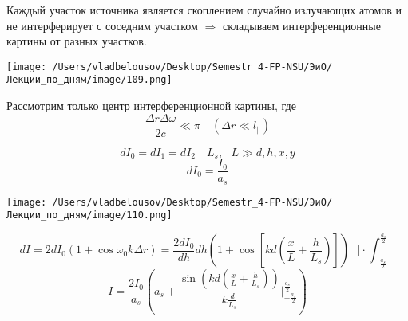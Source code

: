 \documentclass[12pt, a4paper]{report}
\begin{document}
Каждый участок источника является скоплением случайно излучающих атомов и не интерферирует с соседним участком \( \Rightarrow \)  складываем интерференционные картины от разных участков.

\begin{center}
    \texttt{[image: /Users/vladbelousov/Desktop/Semestr\_4-FP-NSU/ЭиО/Лекции\_по\_дням/image/109.png]}
\end{center}  

Рассмотрим только центр интерференционной картины, где 
\[  \displaystyle  \frac{\Delta r \Delta \omega }{2 c } \ll \pi \quad  ( \Delta r \ll l_{ \parallel} ) \] 

\[ d I_0 = d I_1 = d I_2 \quad  L_s , \text{ }  L \gg d, h, x ,y \]
\[ d I_0 = \frac{I_0}{a_s}  \]  

\begin{center}
    \texttt{[image: /Users/vladbelousov/Desktop/Semestr\_4-FP-NSU/ЭиО/Лекции\_по\_дням/image/110.png]}
\end{center} 

\[ d I = 2 d I_0 (1 + \cos \omega_0 k \Delta r ) = \frac{2 d I_0 }{dh      } dh \left( 1 + \cos \left[ k d \left( \frac{x}{L }  + \frac{h}{L_s}  \right) \right] \right)\text{ }  \bigg |\cdot \int _{-\frac{a_s}{2 }  } ^{\frac{a_s}{2 } }     \] 
\[ I = \frac{2 I_0 }{a_s } \left( a_s +\frac{\sin \left( kd \left( \frac{x}{L } + \frac{h}{L_s }  \right) \right)}{k \frac{d}{L_s} }\bigg |_{-\frac{a_s}{2} }^{\frac{a_s}{2} }    \right)   \] 

\ifdefined\mainfile
\else
    
\end{document}
